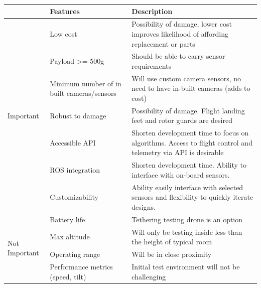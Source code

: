 \documentclass[capstone_report.tex]{subfiles}
\begin{document}
\begin{table}[H]
\centering
\label{test_requirements}
\begin{tabular}{lp{6cm}p{8cm}}
\toprule
                               & Features                                   & Description                                                                                                   \\ \midrule
\multirow{7}{*}{Important}     & Low cost                                   & Possibility of damage, lower cost improves likelihood of affording replacement or parts                       \\
                               & Payload \textgreater= 500g                 & Should be able to carry sensor requirements                                                                   \\
                               & Minimum number of in built cameras/sensors & Will use custom camera sensors, no need to have in-built cameras (adds to cost)                               \\
                               & Robust to damage                           & Possibility of damage.  Flight landing feet and rotor guards are desired                                      \\
                               & Accessible API                             & Shorten development time to focus on algorithms.  Access to flight control and telemetry via API is desirable \\
                               & ROS integration                            & Shorten development time.  Ability to interface with on-board sensors.                                        \\
                               & Customizability                            & Ability easily interface with selected sensors and flexibility to quickly iterate designs.                    \\
\midrule
\multirow{5}{*}{Not Important} & Battery life                               & Tethering testing drone is an option                                                                          \\
                               & Max altitude                               & Will only be testing inside less than the height of typical room                                              \\
                               & Operating range                            &   Will be in close proximity                                                                                                            \\
                               & Performance metrics (speed, tilt)          & Initial test environment will not be challenging                                                              \\ \midrule
\end{tabular}
\end{table}
\end{document}
